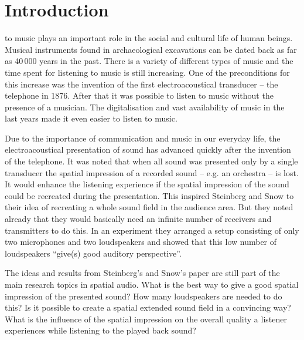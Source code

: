 \def \GITHUB {\GITHUBBASE/01_introduction}

\chapter{Introduction}
\label{cha:introduction}
%
 to music plays an important role in the social and
cultural life of human beings.
Musical instruments found in archaeological excavations can be dated back as far
as 40\,000 years in the past.\autocite[For an overview see][]{dErrico2003}
There is a variety of different types of music and the time spent for
listening to music is still increasing. One of the preconditions for this
increase was the invention of the first electroacoustical transducer -- the
telephone in 1876. After that it was possible to listen to music without the
presence of a musician.
The digitalisation and vast availability of music in the last years made it
even easier to listen to music.\autocite{Sloboda2009}

Due to the importance of communication and music in our everyday life, the
electroacoustical presentation of sound has advanced quickly after the invention of
the telephone.
It was noted that when all sound was presented only by a single transducer the
spatial impression of a recorded sound -- e.g. an orchestra -- is lost.
It would enhance the listening experience if the spatial impression of the
sound could be recreated during the presentation. This inspired Steinberg and
Snow\autocite{Steinberg1934} to their idea of recreating a whole sound field in
the audience area. But they noted already that they would basically need an
infinite number of receivers and transmitters to do this.
In an experiment they arranged a setup consisting of only two microphones and
two loudspeakers and showed that this low number of loudspeakers ``give(s) good
auditory perspective''.

The ideas and results from Steinberg's and Snow's paper are still part of the main research
topics in spatial audio. What is the best way to give a good spatial
impression of the presented sound? How many loudspeakers are needed to do this?
Is it possible to create a spatial
extended sound field in a convincing way? What is the influence of the spatial impression on
the overall quality a listener experiences while listening to the played back
sound?

